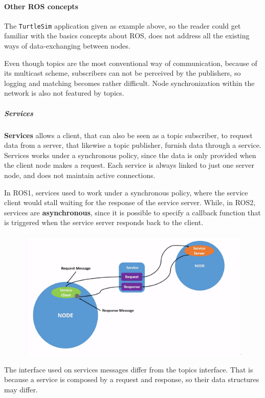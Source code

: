 \paragraph{Other ROS concepts}

The \texttt{TurtleSim} application given as example above, so the reader could get familiar with the basics concepts about ROS, does not address all the existing ways of data-exchanging between nodes.
                
Even though topics are the most conventional way of communication, because of its multicast scheme, subscribers can not be perceived by the publishers, so logging and matching becomes rather difficult. Node synchronization within the network is also not featured by topics.

\subparagraph{Services}

\textbf{Services} allows a client, that can also be seen as a topic subscriber, to request data from a server, that likewise a topic publisher, furnish data through a service. Services works under a synchronous policy, since the data is only provided when the client node makes a request. Each service is always linked to just one server node, and does not maintain active connections.
                
In ROS1, services used to work under a synchronous policy, where the service client would stall waiting for the response of the service server. While, in ROS2, services are \textbf{asynchronous}, since it is possible to specify a callback function that is triggered when the service server responds back to the client.

\begin{figure}[H]
    \centering
    \includegraphics[width=0.7\linewidth]{images/ros2-services.png}
\end{figure}
                
                
The interface used on services messages differ from the topics interface. That is because a service is composed by a request and response, so their data structures may differ. 

